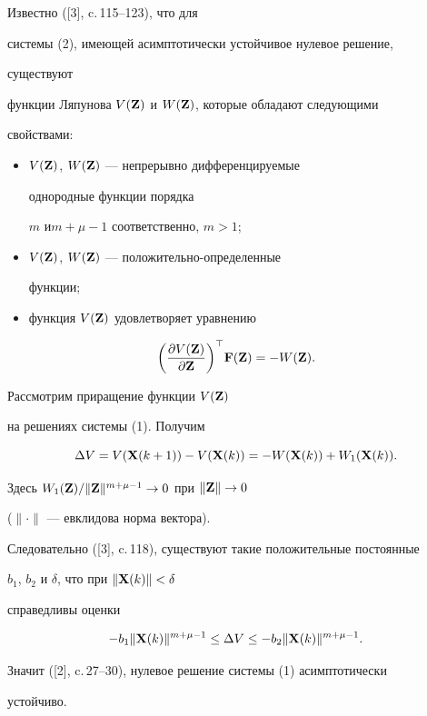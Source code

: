 \begin{pf}


Известно ([3], c.\,115--123), что для


системы (2), имеющей асимптотически устойчивое нулевое решение,


существуют


функции Ляпунова $V(\bold Z)$ и $W(\bold Z)$, которые обладают следующими


свойствами:


\begin{itemize}


\item[1)] $V(\bold Z)$, $W(\bold Z)$ --- непрерывно дифференцируемые


однородные функции порядка


$m$ и\linebreak $m+\mu-1$ соответственно, $m>1$;


\item[2)] $V(\bold Z)$, $W(\bold Z)$ --- положительно-определенные


функции;


\item[3)] функция $V(\bold Z)$ удовлетворяет уравнению


\end{itemize}


$$


\bigg(\frac {\partial V(\bold Z)}{\partial \bold Z}


\bigg)^\top \bold F(\bold Z)


= -W(\bold Z).


$$





Рассмотрим приращение функции $V(\bold Z)$


на решениях системы (1). Получим


$$


\Delta V=V(\bold X(k+1))-V(\bold X(k))


=-W(\bold X(k))+W_1(\bold X(k)).


$$


Здесь $W_1(\bold Z) / \|\bold Z\|^{m+\mu-1}\to 0$ при $\|\bold Z\|\to 0$


($\|\cdot\|$ --- евклидова норма вектора).


Следовательно ([3], c.\,118), существуют такие положительные постоянные


$b_1$, $b_2$ и $\delta$, что при $\| \bold X(k)\|< \delta$


справедливы оценки


\begin{equation}


-b_1 \|\bold X(k)\|^{m+\mu-1}\leq \Delta V\leq


-b_2 \|\bold X(k)\|^{m+\mu-1}.


\end{equation}


Значит ([2], c.\,27--30), нулевое решение системы (1) асимптотически


устойчиво.


\end{pf}





